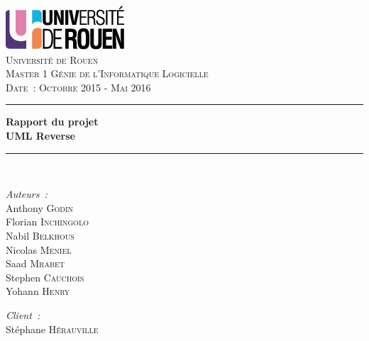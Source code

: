 \documentclass[hidelinks, 10pt,a4paper]{article}
\begin{document}
\thispagestyle{empty}
\begin{center}
\includegraphics{img/logo.png}~\\[1cm]

\textsc{\LARGE Université de Rouen}\\[0.5cm]
\textsc{\large Master 1 Génie de l'Informatique Logicielle}\\[0.5cm]
\textsc{\small Date~: Octobre 2015 - Mai 2016}
\textsc{\Large }\\[0.5cm]

\rule{14cm}{1mm}

{\huge \bfseries Rapport du projet\\ UML Reverse \\[0.4cm] }

\rule{14cm}{1mm}
\\[2cm]
\begin{minipage}{0.4\textwidth}
  \begin{flushleft} \large
    \emph{Auteurs~:}\\
    Anthony \textsc{Godin}\\
    Florian \textsc{Inchingolo}\\
    Nabil \textsc{Belkhous}\\
    Nicolas \textsc{Meniel}\\
    Saad \textsc{Mrabet}\\
    Stephen \textsc{Cauchois}\\
    Yohann \textsc{Henry}\\
   
  \end{flushleft}
\end{minipage}\hfill
\begin{minipage}{0.4\textwidth}
  \begin{flushright} \large
    \emph{Client~:} \\
    Stéphane \textsc{Hérauville}\\
  \end{flushright}
\end{minipage}

\vfill

\end{center}
\end{document}
